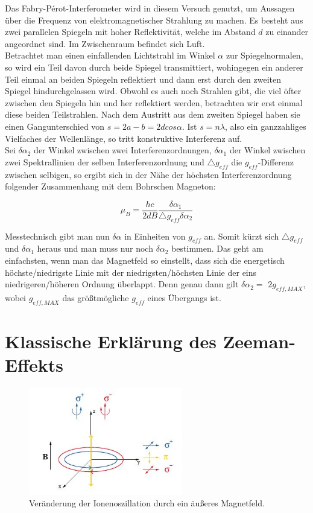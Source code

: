 \documentclass[bigchapter,colorback,accentcolor=tud4b,linedtoc,11pt]{tudreport}
\begin{document}
Das Fabry-Pérot-Interferometer wird in diesem Versuch genutzt, um
Aussagen über die Frequenz von elektromagnetischer Strahlung zu machen.
Es besteht aus zwei parallelen Spiegeln mit hoher Reflektivität, welche
im Abstand $d$ zu einander angeordnet sind. Im Zwischenraum befindet
sich Luft. \\
Betrachtet man einen einfallenden Lichtstrahl im Winkel $\alpha$ zur
Spiegelnormalen, so wird ein Teil davon durch beide Spiegel transmittiert,
wohingegen ein anderer Teil einmal an beiden Spiegeln reflektiert
und dann erst durch den zweiten Spiegel hindurchgelassen wird. Obwohl
es auch noch Strahlen gibt, die viel öfter zwischen den Spiegeln hin
und her reflektiert werden, betrachten wir erst einmal diese beiden
Teilstrahlen. Nach dem Austritt aus dem zweiten Spiegel haben sie
einen Gangunterschied von $s=2a-b=2dcos\alpha$. Ist $s=n\lambda$,
also ein ganzzahliges Vielfaches der Wellenlänge, so tritt konstruktive
Interferenz auf. \\
Sei $\delta\alpha_{2}$ der Winkel zwischen zwei Interferenzordnungen,
$\delta\alpha_{1}$ der Winkel zwischen zwei Spektrallinien der selben
Interferenzordnung und $\triangle g_{eff}$ die $g_{eff}$-Differenz
zwischen selbigen, so ergibt sich in der Nähe der höchsten Interferenzordnung
folgender Zusammenhang mit dem Bohrschen Magneton:

$$\mu_{B}=\frac{hc}{2dB}\frac{\delta\alpha_{1}}{\triangle g_{eff}\delta\alpha_{2}}$$

Messtechnisch gibt man nun $\delta\alpha$ in Einheiten von $g_{eff}$
an. Somit kürzt sich $\triangle g_{eff}$ und $\delta\alpha_{1}$
heraus und man muss nur noch $\delta\alpha_{2}$ bestimmen. Das geht
am einfachsten, wenn man das Magnetfeld so einstellt, dass sich die
energetisch höchste/niedrigste Linie mit der niedrigsten/höchsten
Linie der eins niedrigeren/höheren Ordnung überlappt. Denn genau dann
gilt $\delta\alpha_{2}=$ $2g_{eff,MAX}$, wobei $g_{eff,MAX}$ das
größtmögliche $g_{eff}$ eines Übergangs ist. 


\section{Klassische Erklärung des Zeeman-Effekts}

\begin{figure}[H] 
  \centering
     \includegraphics[width=0.6\textwidth]{data/Zerlegung.jpg}
  \caption{Veränderung der Ionenoszillation durch ein äußeres Magnetfeld.}
  \label{fig:Bild2}
\end{figure}
\end{document}
